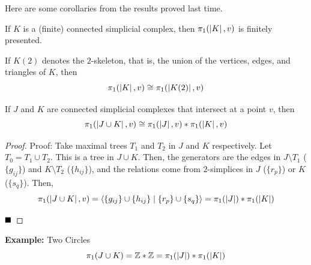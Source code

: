 
Here are some corollaries from the results proved last time.

\begin{lemma}
    If $K$ is a (finite) connected simplicial complex, then $\pi_1(\left\lvert {K} \right\rvert, v)$ is finitely presented.
\end{lemma}

\begin{lemma}
    If $K(2)$ denotes the $2$-skeleton, that is, the union of the vertices, edges, and triangles of $K$, then
    \[ \pi_1(\left\lvert {K} \right\rvert, v) \cong \pi_1(\left\lvert {K(2)} \right\rvert, v) \]
\end{lemma}

\begin{lemma}
    If $J$ and $K$ are connected simplicial complexes that intersect at a point $v$, then
    \[ \pi_1(\left\lvert {J \cup K} \right\rvert, v) \cong \pi_1(\left\lvert {J} \right\rvert, v) * \pi_1(\left\lvert {K} \right\rvert, v) \]
\end{lemma}
\begin{proof}{Proof:}
    Take maximal trees $T_1$ and $T_2$ in $J$ and $K$ respectively. Let $T_0 = T_1 \cup T_2$. This is a tree in $J \cup K$. Then, the generators are the edges in $J \setminus T_1$ ($\{g_{ij}\}$) and $K \setminus T_2$ ($\{h_{ij}\}$), and the relations come from $2$-simplices in $J$ ($\{r_p\}$) or $K$ ($\{s_q\}$). Then,
    \[ \pi_1(\left\lvert {J \cup K} \right\rvert, v) = \left\langle {\{g_{ij}\} \cup \{h_{ij}\} \mid \{r_p\} \cup \{s_q\}} \right\rangle = \pi_1(\left\lvert {J} \right\rvert) * \pi_1(\left\lvert {K} \right\rvert) \]

    $\qed$
\end{proof}

\begin{example}{\textbf{Example:} Two Circles}
    \[ \pi_1(J \cup K) = \mathbb{Z} * \mathbb{Z} = \pi_1(\left\lvert {J} \right\rvert) * \pi_1(\left\lvert {K} \right\rvert) \]
\end{example}

